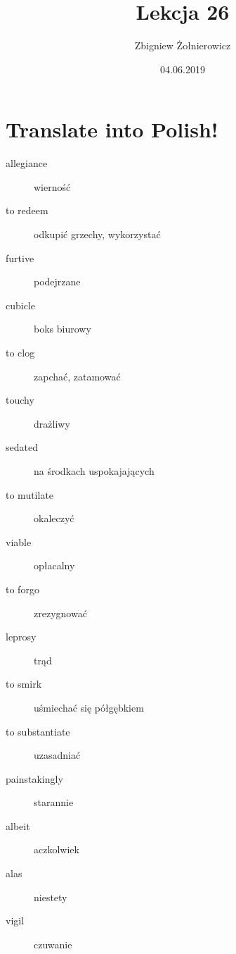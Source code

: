 \documentclass{article}
\begin{document}
\title{{\huge Lekcja 26}}
\author{Zbigniew Żołnierowicz}
\date{04.06.2019}
\maketitle
\section{Translate into Polish!}
\begin{description}
    \item[allegiance] wierność
    \item[to redeem] odkupić grzechy, wykorzystać
    \item[furtive] podejrzane
    \item[cubicle] boks biurowy
    \item[to clog] zapchać, zatamować
    \item[touchy] drażliwy
    \item[sedated] na środkach uspokajających
    \item[to mutilate] okaleczyć
    \item[viable] opłacalny
    \item[to forgo] zrezygnować
    \item[leprosy] trąd
    \item[to smirk] uśmiechać się półgębkiem
    \item[to substantiate] uzasadniać
    \item[painstakingly] starannie
    \item[albeit] aczkolwiek
    \item[alas] niestety
    \item[vigil] czuwanie
\end{description}
\end{document}
